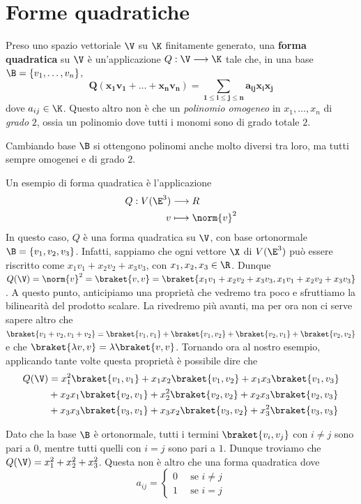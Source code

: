 \documentclass[11pt, a4paper, titlepage, oneside]{scrbook}
\begin{document}
\section{Forme quadratiche}

\begin{Definizione}
\label{def-forma-quadratica}
Preso uno spazio vettoriale $\V$ su $\K$ finitamente generato, una \textbf{forma quadratica} su $\V$ è un'applicazione $Q: \V \longrightarrow \K$ tale che, in una base $\B = \{v_1, \ldots, v_n\}$,
\[
\bm{Q(x_1 v_1 + \ldots + x_n v_n) = \sum_{1 \leq i \leq j \leq n} a_{ij} x_i x_j}
\]
dove $a_{ij} \in \K$. Questo altro non è che un \textit{polinomio omogeneo} in $x_1, \ldots, x_n$ di \textit{grado} $2$, ossia un polinomio dove tutti i monomi sono di grado totale $2$.

\NB Cambiando base $\B$ si ottengono polinomi anche molto diversi tra loro, ma tutti sempre omogenei e di grado $2$.
\end{Definizione}

Un esempio di forma quadratica è l'applicazione
\begin{align*}
Q: V(\E^3) &\longrightarrow R \\
v &\longmapsto \norm{v}^2
\end{align*}
In questo caso, $Q$ è una forma quadratica su $\V$, con base ortonormale $\B = \{v_1, v_2, v_3\}$. Infatti, sappiamo che ogni vettore $\X$ di $V(\E^3)$ può essere riscritto come $x_1 v_1 + x_2 v_2 + x_3 v_3$, con $x_1, x_2, x_3 \in \R$. Dunque $Q(\V) = \norm{v}^2 = \braket{v,v} = \braket{x_1v_1 + x_2v_2 + x_3 v_3, x_1v_1 + x_2v_2 + x_3v_3}$. A questo punto, anticipiamo una proprietà che vedremo tra poco e sfruttiamo la bilinearità del prodotto scalare. La rivedremo più avanti, ma per ora non ci serve sapere altro che \mbox{$\braket{v_1 + v_2, v_1 + v_2} = \braket{v_1, v_1} + \braket{v_1,v_2} + \braket{v_2, v_1} + \braket{v_2,v_2}$} e che $\braket{\lambda v, v} = \lambda \braket{v,v}$. Tornando ora al nostro esempio, applicando tante volte questa proprietà è possibile dire che
\begin{align*}
Q(\V) &= x_1^2\braket{v_1,v_1} + x_1x_2 \braket{v_1,v_2} + x_1 x_3 \braket{v_1,v_3}  \\
&+ x_2x_1 \braket{v_2,v_1} + x_2^2 \braket{v_2,v_2} + x_2 x_3 \braket{v_2,v_3} \\
&+ x_3x_3 \braket{v_3,v_1} + x_3x_2 \braket{v_3,v_2} + x_3^2 \braket{v_3,v_3} 
\end{align*}

Dato che la base $\B$ è ortonormale, tutti i termini $\braket{v_i, v_j}$ con $i \neq j$ sono pari a $0$, mentre tutti quelli con $i = j$ sono pari a $1$. Dunque troviamo che $Q(\V) = x_1^2 + x_2^2 + x_3^2$. Questa non è altro che una forma quadratica dove
\[
a_{ij} = 
\begin{cases}
0 & \enspace \text{se } i \neq j \\
1 & \enspace \text{se } i = j 
\end{cases}
\]
\end{document}
